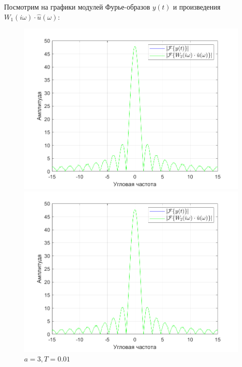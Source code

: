 \documentclass[a4paper]{article}
\begin{document}
Посмотрим на графики модулей Фурье-образов $y(t)$ и произведения $W_1(i\omega) \cdot \hat{u}(\omega)$:

\begin{figure}[H]
    \begin{minipage}{0.5\textwidth}
        \centering
        \includegraphics[width=\linewidth]{ex1_1/a=3_T=0.001/h4.png}
        \caption{$a = 3, T = 0.001$}
    \end{minipage}
    \begin{minipage}{0.5\textwidth}
        \centering
        \includegraphics[width=\linewidth]{ex1_1/a=3_T=0.01/h4.png}
        \caption{$a = 3, T = 0.01$}
    \end{minipage}
\end{figure}
\end{document}
